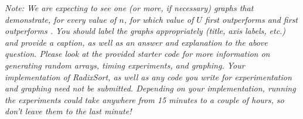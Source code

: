 \documentclass[11pt]{article}
\begin{document}
\begin{enumerate}
\begin{enumerate}
            \textit{Note: We are expecting to see one (or more, if necessary) graphs that demonstrate, for every value of $n$, for which value of $U$ \RadixSort first outperforms \CountingSort and \MergeSort first outperforms \RadixSort. You should label the graphs appropriately (title, axis labels, etc.) and provide a caption, as well as an answer and explanation to the above question. Please look at the provided starter code for more information on generating random arrays, timing experiments, and graphing. Your implementation of RadixSort, as well as any code you write for experimentation and graphing need not be submitted.  Depending on your implementation, running the experiments could take anywhere from 15 minutes to a couple of hours, so don't leave them to the last minute!}   

          
        \end{enumerate}

\end{enumerate}
\end{document}
